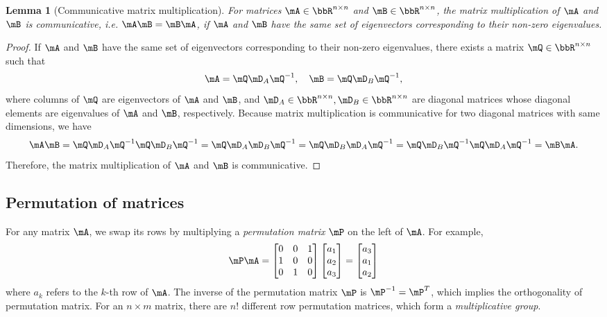 \documentclass[11pt]{article}
\theoremstyle{plain}
\newtheorem{lem}{Lemma}
\theoremstyle{definition}
\begin{document}
\begin{lem}[Communicative matrix multiplication]\label{lem:matrixcomm} For matrices $\mA \in \bbR^{n \times n}$ and $\mB \in \bbR^{n \times n}$, the matrix multiplication of $\mA$ and $\mB$ is communicative, i.e. $\mA\mB  = \mB \mA$, if $\mA$ and $\mB$ have the same set of eigenvectors corresponding to their non-zero eigenvalues.	
\end{lem}

\begin{proof}
	If $\mA$ and $\mB$ have the same set of eigenvectors corresponding to their non-zero eigenvalues, there exists a matrix $\mQ \in \bbR^{n \times n}$ such that
	\[ \mA = \mQ \mD_A \mQ^{-1}, \quad \mB = \mQ \mD_B \mQ^{-1},\]
	where columns of $\mQ$ are eigenvectors of $\mA$ and $\mB$, and $\mD_A\in\bbR^{n \times n},  \mD_B\in\bbR^{n \times n} $ are diagonal matrices whose diagonal elements are eigenvalues of $\mA$ and $\mB$, respectively. Because matrix multiplication is communicative for two diagonal matrices with same dimensions, we have
	\[  \mA \mB = \mQ \mD_A \mQ^{-1} \mQ \mD_B \mQ^{-1} = \mQ \mD_A \mD_B \mQ^{-1}  =\mQ \mD_B \mD_A \mQ^{-1} = \mQ \mD_B \mQ^{-1} \mQ \mD_A \mQ^{-1}  = \mB \mA .\]
	Therefore, the matrix multiplication of $\mA$ and $\mB$ is communicative.
\end{proof}

\subsection{Permutation of matrices}
For any matrix $\mA$, we swap its rows by multiplying a \textit{permutation matrix } $\mP$ on the left of $\mA$. For example,
\begin{align}
	\mP \mA = \begin{bmatrix}
		0 &0&1\\1 & 0 & 0\\ 0 & 1 & 0 
	\end{bmatrix}  \begin{bmatrix}
		a_1\\a_2\\ a_3
	\end{bmatrix}  = \begin{bmatrix}
		a_3\\a_1\\ a_2
	\end{bmatrix}
\end{align}
where $a_k$ refers to the $k$-th row of $\mA$. The inverse of the permutation matrix $\mP$ is $\mP^{-1} = \mP^T$, which implies the orthogonality of permutation matrix. For an $n \times m$ matrix, there are $n!$ different row permutation matrices, which form a \textit{multiplicative group}.
\end{document}
